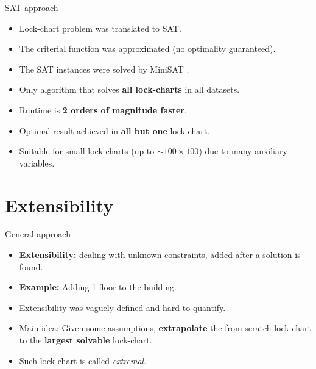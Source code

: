 \begin{frame}{SAT approach}
  \begin{itemize}
    \item Lock-chart problem was translated to SAT.
    \item The criterial function was approximated (no optimality guaranteed).
    \item The SAT instances were solved by MiniSAT \cite{een2003}.
    \pause
    \item Only algorithm that solves \textbf{all lock-charts} in all datasets.
    \item Runtime is \textbf{2 orders of magnitude faster}.
    \item Optimal result achieved in \textbf{all but one} lock-chart.
    \item Suitable for small lock-charts (up to $\sim 100\times 100$) due to many auxiliary variables.
  \end{itemize}
\end{frame}



\section{Extensibility}
\sectionframe



\begin{frame}{General approach}
  \begin{itemize}
    \item \textbf{Extensibility:} dealing with unknown constraints,
    added after a solution is found.
    \item \textbf{Example:} Adding 1 floor to the building.
    \pause    
    \item Extensibility was vaguely defined and hard to quantify.
    \item Main idea: Given some assumptions,
    \textbf{extrapolate} the from-scratch lock-chart
    to the \textbf{largest solvable} lock-chart.
    \item Such lock-chart is called \textit{extremal}.
  \end{itemize}
\end{frame}

